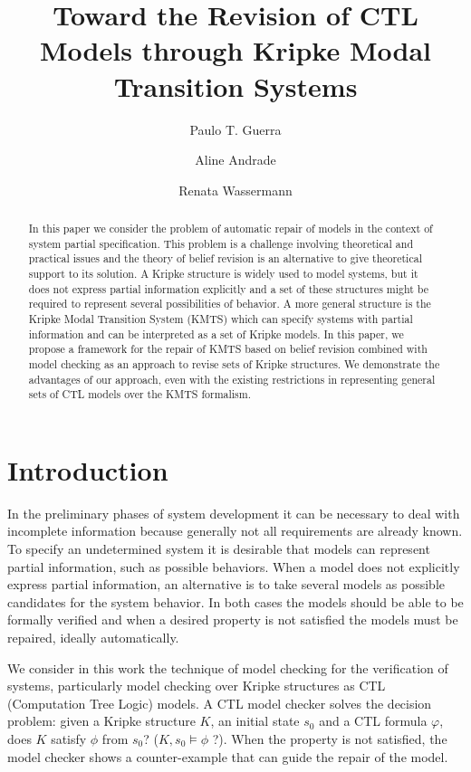 \documentclass{llncs}
\title{Toward the Revision of CTL Models through Kripke Modal Transition Systems}
\author{Paulo T. Guerra \inst{1} \and Aline Andrade \inst{2} \and Renata Wassermann \inst{1}}
\institute{University of S\~ao Paulo\\
        \{paulotgo,renata\}@ime.usp.br
	\and
	Federal University of Bahia \\		
	aline@ufba.br
}
\begin{document}
 

\maketitle

     
\begin{abstract} 
In this paper we consider the problem of automatic repair of models in the context of  system partial specification. This problem is a challenge involving theoretical and practical issues and the theory of belief revision is an alternative to give theoretical support to its solution. 
A Kripke structure is widely used to model systems, but it does not express partial information explicitly and a set of these structures might be required to represent several possibilities of behavior. A more general structure is the Kripke Modal Transition System (KMTS) which can specify systems with partial information and can be interpreted as a set of Kripke models. In this paper, we propose a framework for the repair of KMTS based on belief revision combined with model checking as an approach to revise sets of Kripke structures. We demonstrate the advantages of our approach, even with the existing restrictions in representing general sets of CTL models over the KMTS formalism.
\end{abstract}

\section{Introduction}
In the preliminary phases of system development it can be necessary to deal with incomplete information because generally not all requirements are already known. To specify an undetermined system it is desirable that models can represent partial information, such as possible behaviors. When a model does not explicitly express partial information, an alternative is to take several models as possible candidates for the system behavior. In both cases the models should be able to be formally verified and when a desired property is not satisfied the models must be repaired, ideally automatically.   

We consider in this work the technique of model checking \cite{CGP99} for the verification of systems, particularly model checking over Kripke structures as CTL (Computation Tree Logic) models. A CTL model checker solves the decision problem: given a Kripke structure $K$, an initial state $s_0$ and a CTL formula $\varphi$, does $K$ satisfy $\phi$ from $s_0$? ($K,s_0 \models \phi$ ?). When the property is not satisfied, the model checker shows a counter-example that can guide the repair of the model.
\end{document}
